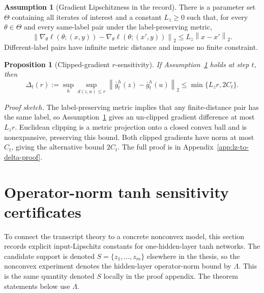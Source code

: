\documentclass[11pt,a4paper]{report}
\theoremstyle{plain}
\newtheorem{proposition}[theorem]{Proposition}
\theoremstyle{definition}
\newtheorem{assumption}[theorem]{Assumption}
\theoremstyle{remark}
\newcommand{\norm}[1]{\left\lVert #1\right\rVert}
\begin{document}
\begin{assumption}[Gradient Lipschitzness in the record]
\label{assump:lz}
There is a parameter set $\Theta$ containing all iterates of interest and a constant $L_z\ge0$ such that, for every $\theta\in\Theta$ and every same-label pair under the label-preserving metric,
\[
\norm{\nabla_\theta\ell(\theta;(x,y))-\nabla_\theta\ell(\theta;(x',y))}_2
\le
L_z\norm{x-x'}_2.
\]
Different-label pairs have infinite metric distance and impose no finite constraint.
\end{assumption}

\begin{proposition}[Clipped-gradient $r$-sensitivity]
\label{prop:lz-to-delta}
If Assumption~\ref{assump:lz} holds at step $t$, then
\[
\Delta_t(r)
:=
\sup_h\sup_{d(z,u)\le r}
\norm{\bar g_t^h(z)-\bar g_t^h(u)}_2
\le
\min\{L_zr,2C_t\}.
\]
\end{proposition}

\noindent\emph{Proof sketch.}
The label-preserving metric implies that any finite-distance pair has the same label, so Assumption~\ref{assump:lz} gives an un-clipped gradient difference at most $L_zr$.  Euclidean clipping is a metric projection onto a closed convex ball and is nonexpansive, preserving this bound.  Both clipped gradients have norm at most $C_t$, giving the alternative bound $2C_t$.  The full proof is in Appendix~\ref{app:lz-to-delta-proof}.

\section{Operator-norm tanh sensitivity certificates}
\label{sec:tanh-certificates}

To connect the transcript theory to a concrete nonconvex model, this section records explicit input-Lipschitz constants for one-hidden-layer tanh networks.  The candidate support is denoted $S=\{z_1,\ldots,z_m\}$ elsewhere in the thesis, so the nonconvex experiment denotes the hidden-layer operator-norm bound by $\Lambda$.  This is the same quantity denoted $S$ locally in the proof appendix.  The theorem statements below use $\Lambda$.
\end{document}
